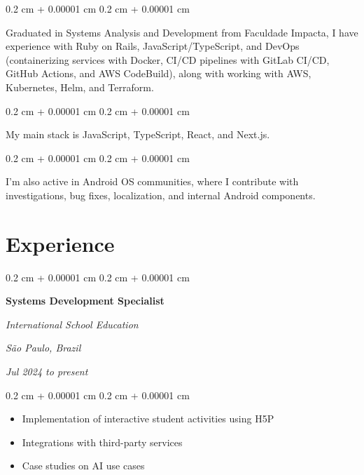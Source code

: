 \documentclass[10pt, a4paper]{article}
\newenvironment{highlights}{
    \begin{itemize}[
        topsep=0.10 cm,
        parsep=0.10 cm,
        partopsep=0pt,
        itemsep=0pt,
        leftmargin=0.4 cm + 10pt
    ]
}{
    \end{itemize}
} %
\newenvironment{onecolentry}{
    \begin{adjustwidth}{
        0.2 cm + 0.00001 cm
    }{
        0.2 cm + 0.00001 cm
    }
}{
    \end{adjustwidth}
} %
\newenvironment{twocolentry}[2][]{
    \onecolentry
    \def\secondColumn{#2}
    \setcolumnwidth{\fill, 7 cm}
    \begin{paracol}{2}
}{
    \switchcolumn \raggedleft \secondColumn
    \end{paracol}
    \endonecolentry
} %
\begin{document}
        \vspace{0.2 cm}

        \begin{onecolentry}
            Graduated in Systems Analysis and Development from Faculdade Impacta, I have experience with Ruby on Rails, JavaScript/TypeScript, and DevOps (containerizing services with Docker, CI/CD pipelines with GitLab CI/CD, GitHub Actions, and AWS CodeBuild), along with working with AWS, Kubernetes, Helm, and Terraform.
        \end{onecolentry}

        \vspace{0.2 cm}

        \begin{onecolentry}
            My main stack is JavaScript, TypeScript, React, and Next.js.
        \end{onecolentry}

        \vspace{0.2 cm}

        \begin{onecolentry}
            I'm also active in Android OS communities, where I contribute with investigations, bug fixes, localization, and internal Android components.
        \end{onecolentry}


    
    \section{Experience}



        
        \begin{twocolentry}{
        \textit{São Paulo, Brazil}    
            
        \textit{Jul 2024 to present}}
            \textbf{Systems Development Specialist}
            
            \textit{International School Education}
        \end{twocolentry}

        \vspace{0.10 cm}
        \begin{onecolentry}
            \begin{highlights}
                \item Implementation of interactive student activities using H5P
                \item Integrations with third-party services
                \item Case studies on AI use cases
            \end{highlights}
        \end{onecolentry}
\end{document}
